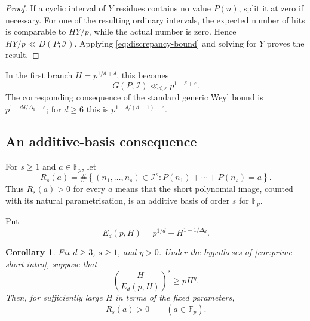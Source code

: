 \documentclass[11pt,reqno]{amsart}
\numberwithin{equation}{section}
\newtheorem{corollary}[corollary]{Corollary}
\theoremstyle{definition}
\theoremstyle{remark}
\begin{document}
\begin{proof}
If a cyclic interval of $Y$ residues contains no value $P(n)$, split it at zero if necessary.  For one of the resulting ordinary intervals, the expected number of hits is comparable to $HY/p$, while the actual number is zero.  Hence
$HY/p\ll D(P;\mathcal I)$.  Applying \eqref{eq:discrepancy-bound} and solving for $Y$ proves the result.
\end{proof}

In the first branch $H=p^{1/d+\delta}$, this becomes
\begin{equation}\label{eq:gap-first-branch}
  G(P;\mathcal I)\ll_{d,\varepsilon}p^{1-\delta+\varepsilon}.
\end{equation}
The corresponding consequence of the standard generic Weyl bound is
$p^{1-d\delta/\Delta_d+\varepsilon}$; for $d\ge6$ this is
$p^{1-\delta/(d-1)+\varepsilon}$.

\subsection{An additive-basis consequence}

For $s\ge1$ and $a\in\mathbb F_p$, let
\begin{equation}\label{eq:representation-function}
  R_s(a)=\#\left\{(n_1,\ldots,n_s)\in\mathcal I^s:
  P(n_1)+\cdots+P(n_s)=a\right\}.
\end{equation}
Thus $R_s(a)>0$ for every $a$ means that the short polynomial image, counted with its natural parametrisation, is an additive basis of order $s$ for $\mathbb F_p$.

Put
\begin{equation}\label{eq:E-def-additive}
  E_d(p,H)=p^{1/d}+H^{1-1/\Delta_d}.
\end{equation}

\begin{corollary}\label{cor:additive-basis}
Fix $d\ge3$, $s\ge1$, and $\eta>0$.  Under the hypotheses of \cref{cor:prime-short-intro}, suppose that
\begin{equation}\label{eq:additive-basis-condition}
  \left(\frac{H}{E_d(p,H)}\right)^s
  \ge pH^\eta.
\end{equation}
Then, for sufficiently large $H$ in terms of the fixed parameters,
\[
  R_s(a)>0\qquad(a\in\mathbb F_p).
\]
\end{corollary}
\end{document}
